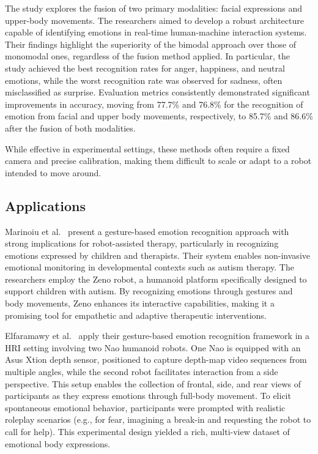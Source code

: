 The study explores the fusion of two primary modalities: facial expressions and upper-body movements. The researchers aimed to develop a robust architecture capable of identifying emotions in real-time human-machine interaction systems. Their findings highlight the superiority of the bimodal approach over those of monomodal ones, regardless of the fusion method applied. In particular, the study achieved the best recognition rates for anger, happiness, and neutral emotions, while the worst recognition rate was observed for sadness, often misclassified as surprise. Evaluation metrics consistently demonstrated significant improvements in accuracy, moving from 77.7\% and 76.8\% for the recognition of emotion from facial and upper body movements, respectively, to 85.7\% and 86.6\% after the fusion of both modalities.

While effective in experimental settings, these methods often require a fixed camera and precise calibration, making them difficult to scale or adapt to a robot intended to move around.

\subsection{Applications}
Marinoiu et al.\ \cite{8578328} present a gesture-based emotion recognition approach with strong implications for robot-assisted therapy, particularly in recognizing emotions expressed by children and therapists. Their system enables non-invasive emotional monitoring in developmental contexts such as autism therapy. The researchers employ the Zeno robot, a humanoid platform specifically designed to support children with autism. By recognizing emotions through gestures and body movements, Zeno enhances its interactive capabilities, making it a promising tool for empathetic and adaptive therapeutic interventions.

Elfaramawy et al.\ \cite{Elfaramawy2017-ab} apply their gesture-based emotion recognition framework in a HRI setting involving two Nao humanoid robots. One Nao is equipped with an Asus Xtion depth sensor, positioned to capture depth-map video sequences from multiple angles, while the second robot facilitates interaction from a side perspective. This setup enables the collection of frontal, side, and rear views of participants as they express emotions through full-body movement. To elicit spontaneous emotional behavior, participants were prompted with realistic roleplay scenarios (e.g., for fear, imagining a break-in and requesting the robot to call for help). This experimental design yielded a rich, multi-view dataset of emotional body expressions.

